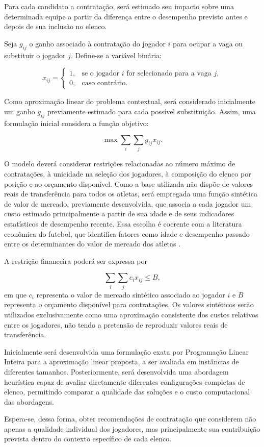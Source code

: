 \documentclass[12pt,a4paper]{article}
\begin{document}
Para cada candidato a contratação, será estimado seu impacto sobre uma determinada equipe a partir da diferença entre o desempenho previsto antes e depois de sua inclusão no elenco.

Seja $g_{ij}$ o ganho associado à contratação do jogador $i$ para ocupar a vaga ou substituir o jogador $j$. Define-se a variável binária:

\[
x_{ij} =
\begin{cases}
1, & \text{se o jogador $i$ for selecionado para a vaga $j$},\\
0, & \text{caso contrário}.
\end{cases}
\]

Como aproximação linear do problema contextual, será considerado inicialmente um ganho $g_{ij}$ previamente estimado para cada possível substituição. Assim, uma formulação inicial considera a função objetivo:

\[
\max \sum_i \sum_j g_{ij} x_{ij}.
\]

O modelo deverá considerar restrições relacionadas ao número máximo de contratações, à unicidade na seleção dos jogadores, à composição do elenco por posição e ao orçamento disponível. Como a base utilizada não dispõe de valores reais de transferência para todos os atletas, será empregada uma função sintética de valor de mercado, previamente desenvolvida, que associa a cada jogador um custo estimado principalmente a partir de sua idade e de seus indicadores estatísticos de desempenho recente. Essa escolha é coerente com a literatura econômica do futebol, que identifica fatores como idade e desempenho passado entre os determinantes do valor de mercado dos atletas \parencite{dobson1999,pantuso2017}.

A restrição financeira poderá ser expressa por

\[
\sum_i \sum_j c_i x_{ij} \leq B,
\]
em que $c_i$ representa o valor de mercado sintético associado ao jogador $i$ e $B$ representa o orçamento disponível para contratações. Os valores sintéticos serão utilizados exclusivamente como uma aproximação consistente dos custos relativos entre os jogadores, não tendo a pretensão de reproduzir valores reais de transferência.

Inicialmente será desenvolvida uma formulação exata por Programação Linear Inteira para a aproximação linear proposta, a ser avaliada em instâncias de diferentes tamanhos. Posteriormente, será desenvolvida uma abordagem heurística capaz de avaliar diretamente diferentes configurações completas de elenco, permitindo comparar a qualidade das soluções e o custo computacional das abordagens.

Espera-se, dessa forma, obter recomendações de contratação que considerem não apenas a qualidade individual dos jogadores, mas principalmente sua contribuição prevista dentro do contexto específico de cada elenco.
\end{document}
